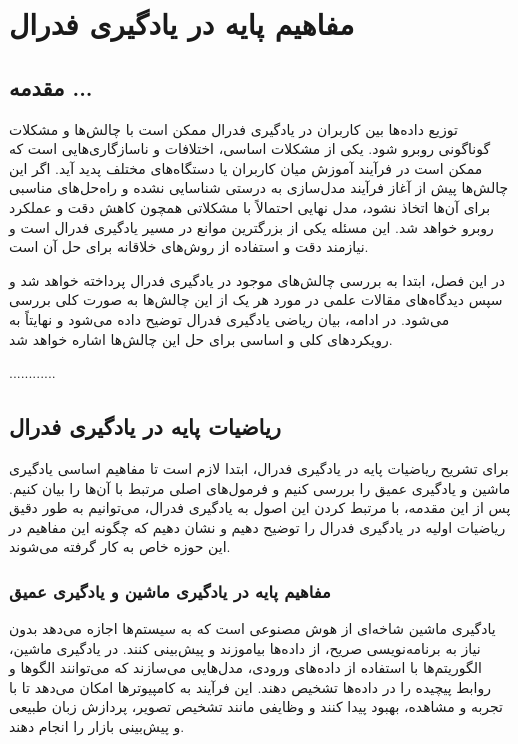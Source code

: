 \chapter{مفاهیم پایه در یادگیری فدرال}

\section{مقدمه ...}
توزیع داده‌ها بین کاربران در یادگیری فدرال ممکن است با چالش‌ها و مشکلات گوناگونی روبرو شود. یکی از مشکلات اساسی، اختلافات و ناسازگاری‌هایی است که ممکن است در فرآیند آموزش میان کاربران یا دستگاه‌های مختلف پدید آید. اگر این چالش‌ها پیش از آغاز فرآیند مدل‌سازی به درستی شناسایی نشده و راه‌حل‌های مناسبی برای آن‌ها اتخاذ نشود، مدل نهایی احتمالاً با مشکلاتی همچون کاهش دقت و عملکرد روبرو خواهد شد. این مسئله یکی از بزرگترین موانع در مسیر یادگیری فدرال است و نیازمند دقت و استفاده از روش‌های خلاقانه برای حل آن است.

در این فصل، ابتدا به بررسی چالش‌های موجود در یادگیری فدرال پرداخته خواهد شد و سپس دیدگاه‌های مقالات علمی در مورد هر یک از این چالش‌ها به صورت کلی بررسی می‌شود. در ادامه، بیان ریاضی یادگیری فدرال توضیح داده می‌شود و نهایتاً به رویکردهای کلی و اساسی برای حل این چالش‌ها اشاره خواهد شد.

............

\section{ریاضیات پایه در یادگیری فدرال}
برای تشریح ریاضیات پایه در یادگیری فدرال، ابتدا لازم است تا مفاهیم اساسی یادگیری ماشین و یادگیری عمیق را بررسی کنیم و فرمول‌های اصلی مرتبط با آن‌ها را بیان کنیم. پس از این مقدمه، با مرتبط کردن این اصول به یادگیری فدرال، می‌توانیم به طور دقیق ریاضیات اولیه در یادگیری فدرال را توضیح دهیم و نشان دهیم که چگونه این مفاهیم در این حوزه خاص به کار گرفته می‌شوند.

\subsection{مفاهیم پایه در یادگیری ماشین و یادگیری عمیق}
یادگیری ماشین شاخه‌ای از هوش مصنوعی است که به سیستم‌ها اجازه می‌دهد بدون نیاز به برنامه‌نویسی صریح، از داده‌ها بیاموزند و پیش‌بینی کنند. در یادگیری ماشین، الگوریتم‌ها با استفاده از داده‌های ورودی، مدل‌هایی می‌سازند که می‌توانند الگوها و روابط پیچیده را در داده‌ها تشخیص دهند. این فرآیند به کامپیوترها امکان می‌دهد تا با تجربه و مشاهده، بهبود پیدا کنند و وظایفی مانند تشخیص تصویر، پردازش زبان طبیعی و پیش‌بینی بازار را انجام دهند.

